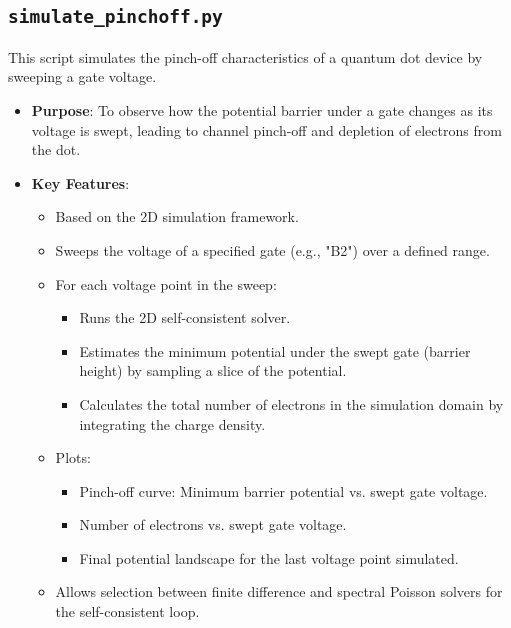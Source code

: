 \documentclass{article}
\begin{document}
\subsection{\texttt{simulate\_pinchoff.py}}
This script simulates the pinch-off characteristics of a quantum dot device by sweeping a gate voltage.
\begin{itemize}
	\item \textbf{Purpose}: To observe how the potential barrier under a gate changes as its voltage is swept, leading to channel pinch-off and depletion of electrons from the dot.
	\item \textbf{Key Features}:
	      \begin{itemize}
		      \item Based on the 2D simulation framework.
		      \item Sweeps the voltage of a specified gate (e.g., "B2") over a defined range.
		      \item For each voltage point in the sweep:
		            \begin{itemize}
			            \item Runs the 2D self-consistent solver.
			            \item Estimates the minimum potential under the swept gate (barrier height) by sampling a slice of the potential.
			            \item Calculates the total number of electrons in the simulation domain by integrating the charge density.
		            \end{itemize}
		      \item Plots:
		            \begin{itemize}
			            \item Pinch-off curve: Minimum barrier potential vs. swept gate voltage.
			            \item Number of electrons vs. swept gate voltage.
			            \item Final potential landscape for the last voltage point simulated.
		            \end{itemize}
		      \item Allows selection between finite difference and spectral Poisson solvers for the self-consistent loop.
	      \end{itemize}
\end{itemize}
\end{document}
